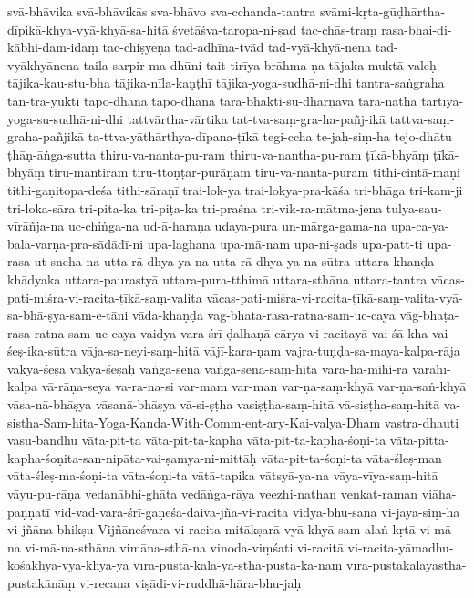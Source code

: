 {svā-bhāvika
svā-bhāvikās
    sva-bhāvo
sva-cchanda-tantra
    svāmi-kṛta-gūḍhārtha-dīpikā-khya-vyā-khyā-sa-hitā
śvetāśva-taropa-ni-ṣad
    tac-chās-traṃ rasa-bhai-di-kābhi-dam-idaṃ
tac-chiṣyeṇa
    tad-adhīna-tvād
     tad-vyā-khyā-nena 
  tad-vyākhyānena 
taila-sarpir-ma-dhūni
tait-tirīya-brāhma-ṇa
tājaka-muktā-valeḥ
tājika-kau-stu-bha
tājika-nīla-kaṇṭhī
tājika-yoga-sudhā-ni-dhi
tantra-saṅgraha
tan-tra-yukti
tapo-dhana
tapo-dhanā
tārā-bhakti-su-dhārṇava
tārā-nātha
tārtīya-yoga-su-sudhā-ni-dhi
tattvārtha-vārtika
    tat-tva-saṃ-gra-ha-pañj-ikā
    tattva-saṃ-graha-pañjikā
    ta-ttva-yāthārthya-dīpana-ṭīkā  
tegi-ccha
te-jaḥ-siṃ-ha
tejo-dhātu
ṭhāṇ-āṅga-sutta
    thiru-va-nanta-pu-ram    thiru-va-nantha-pu-ram
     ṭīkā-bhyāṃ 
ṭīkā-bhyāṃ
tiru-mantiram
tiru-ttoṇṭar-purāṇam
tiru-va-nanta-puram
tithi-cintā-maṇi
tithi-gaṇitopa-deśa
tithi-sāraṇī
trai-lok-ya
trai-lokya-pra-kāśa
tri-bhāga
tri-kam-ji
tri-loka-sāra
tri-pita-ka
tri-piṭa-ka
tri-praśna
tri-vik-ra-mātma-jena
tulya-sau-vīrāñja-na
uc-chiṅga-na
ud-ā-haraṇa
udaya-pura
un-mārga-gama-na
upa-ca-ya-bala-varṇa-pra-sādādī-ni
upa-laghana
    upa-mā-nam
upa-ni-ṣads
upa-patt-ti
upa-rasa
ut-sneha-na
utta-rā-dhya-ya-na
utta-rā-dhya-ya-na-sūtra
uttara-khaṇḍa-khādyaka
uttara-paurastyā
uttara-pura-tthimā
uttara-sthāna
uttara-tantra
vācas-pati-miśra-vi-racita-ṭīkā-saṃ-valita
vācas-pati-miśra-vi-racita-ṭīkā-saṃ-valita-vyā-sa-bhā-ṣya-sam-e-tāni
vāda-khaṇḍa
vag-bhata-rasa-ratna-sam-uc-caya
vāg-bhaṭa-rasa-ratna-sam-uc-caya
vaidya-vara-śrī-ḍalhaṇā-cārya-vi-racitayā
vai-śā-kha
vai-śeṣ-ika-sūtra
vāja-sa-neyi-saṃ-hitā
vājī-kara-ṇam
    vajra-tuṇḍa-sa-maya-kalpa-rāja
vākya-śeṣa
vākya-śeṣaḥ
vaṅga-sena
vaṅga-sena-saṃ-hitā
varā-ha-mihi-ra
vārāhī-kalpa
vā-rāṇa-seya
va-ra-na-si
var-mam
var-man
var-ṇa-saṃ-khyā
var-ṇa-saṅ-khyā
vāsa-nā-bhāṣya
vāsanā-bhāṣya
vā-si-ṣṭha
vasiṣṭha-saṃ-hitā
vā-siṣṭha-saṃ-hitā
va-sistha-Sam-hita-Yoga-Kanda-With-Comm-ent-ary-Kai-valya-Dham
vastra-dhauti
vasu-bandhu
vāta-pit-ta
vāta-pit-ta-kapha
vāta-pit-ta-kapha-śoṇi-ta
vāta-pitta-kapha-śoṇita-san-nipāta-vai-ṣamya-ni-mittāḥ
vāta-pit-ta-śoṇi-ta
vāta-śleṣ-man
vāta-śleṣ-ma-śoṇi-ta
vāta-śoṇi-ta
vātā-tapika
vātsyā-ya-na
vāya-vīya-saṃ-hitā
    vāyu-pu-rāṇa 
vedanābhi-ghāta
vedāṅga-rāya
veezhi-nathan
venkat-raman
viāha-paṇṇatī
vid-vad-vara-śrī-gaṇeśa-daiva-jña-vi-racita
vidya-bhu-sana
vi-jaya-siṃ-ha
vi-jñāna-bhikṣu
Vijñāneśvara-vi-racita-mitākṣarā-vyā-khyā-sam-alaṅ-kṛtā
vi-mā-na
vi-mā-na-sthāna
vimāna-sthā-na
vinoda-viṃśati
vi-racitā
vi-racita-yāmadhu-kośākhya-vyā-khya-yā
    vīra-pusta-kāla-ya-stha-pusta-kā-nāṃ
vīra-pustakālayastha-pustakānāṃ
vi-recana
    viṣādi-vi-ruddhā-hāra-bhu-jaḥ
}
